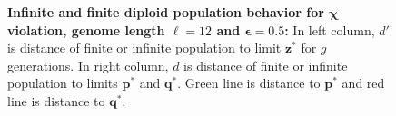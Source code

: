 \begin{figure}[h]
\begin{center}
\hspace{-3em}%
\vspace{-0.5em}  \hspace{-3em}%


\caption[\textbf{Infinite and finite diploid population behavior for $\bm{\chi}$ violation, genome length $\ell = 12$ and $\bm{\epsilon} = 0.5$}]{\textbf{Infinite and finite diploid population behavior for $\bm{\chi}$ violation, genome length $\ell = 12$ and $\bm{\epsilon} = 0.5$:} 
  In left column, $d'$ is distance of finite or infinite population to limit $\bm{z}^\ast$ for $g$ generations. In right column, $d$ is distance of finite or infinite population to limits $\bm{p}^\ast$ and $\bm{q}^\ast$. Green line is distance to $\bm{p}^\ast$ and red line is distance to $\bm{q}^\ast$.}
\label{oscillation_12d_vio_chi_0.5}
\end{center}
\end{figure}

